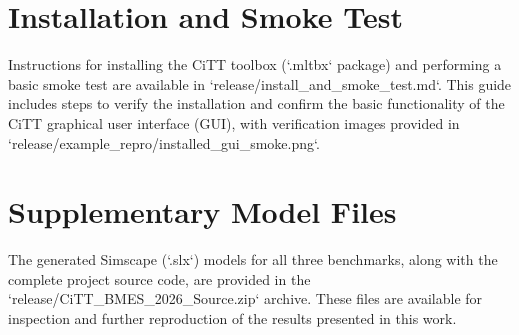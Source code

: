\documentclass[10pt,twocolumn,letterpaper]{article}
\begin{document}
\section{Installation and Smoke Test}
\label{sec:appendix_install_smoke}
Instructions for installing the CiTT toolbox (`.mltbx` package) and performing a basic smoke test are available in `release/install_and_smoke_test.md`. This guide includes steps to verify the installation and confirm the basic functionality of the CiTT graphical user interface (GUI), with verification images provided in `release/example_repro/installed_gui_smoke.png`.

\section{Supplementary Model Files}
\label{sec:appendix_models}
The generated Simscape (`.slx`) models for all three benchmarks, along with the complete project source code, are provided in the `release/CiTT_BMES_2026_Source.zip` archive. These files are available for inspection and further reproduction of the results presented in this work.
\end{document}
